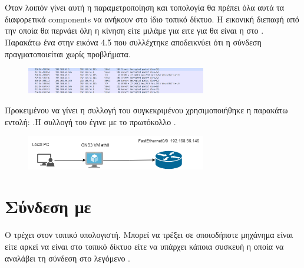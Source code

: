 \section{ }


Όταν λοιπόν γίνει αυτή η παραμετροποίηση και τοπολογία θα πρέπει όλα αυτά τα διαφορετικά components να ανήκουν στο ίδιο τοπικό δίκτυο.
Η εικονική διεπαφή από την οποία θα περνάει όλη η κίνηση είτε μιλάμε για  ειτε για  θα είναι η  στο . Παρακάτω ένα 
 στην εικόνα 4.5 που συλλέχτηκε αποδεικνύει ότι η σύνδεση πραγματοποιείται χωρίς προβλήματα.

\begin{figure}[htb]
	\centering
	\includegraphics[width=0.7\textwidth]{graphics/ssh_connection.png}
	\caption{ }
\end{figure}


Προκειμένου να γίνει η συλλογή του συγκεκριμένου  χρησιμοποιήθηκε η παρακάτω εντολή:
.Η συλλογή του  έγινε με το πρωτόκολλο .


\begin{figure}[h]
	\centering
	\includegraphics[width=0.7\textwidth]{graphics/jason1.png}
	\caption{ }
\end{figure}

\FloatBarrier

\section{Σύνδεση με  }

Ο  τρέχει στον τοπικό υπολογιστή. Μπορεί να τρέξει σε οποιοδήποτε
μηχάνημα είναι  είτε  αρκεί να είναι στο τοπικό δίκτυο
είτε να υπάρχει κάποια συσκευή  η οποία να αναλάβει τη σύνδεση στο λεγόμενο
.